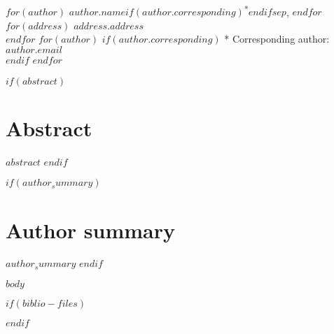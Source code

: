 \documentclass{article}
\begin{document}
\vspace*{0.2in}

\begin{flushleft}
{\Large
\textbf{} %
}
\newline
\\
$for(author)$
$author.name$\textsuperscript{}$if(author.corresponding)$\textsuperscript{*}$endif$$sep$,
$endfor$
\\
\bigskip
$for(address)$
\textbf{}$address.address$\\
$endfor$
\bigskip
$for(author)$
$if(author.corresponding)$
* Corresponding author: $author.email$\\
$endif$
$endfor$
\end{flushleft}
$if(abstract)$
\section*{Abstract}
$abstract$
$endif$

$if(author_summary)$
\section*{Author summary}
$author_summary$
$endif$

\linenumbers

$body$

\nolinenumbers

$if(biblio-files)$

$endif$
\end{document}

